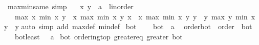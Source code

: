 \begin{isabellebody}
\endisatagproof
{\isafoldproof}%
%
\isadelimproof
\isanewline
%
\endisadelimproof
\isanewline
{}\isamarkupfalse%
\ max{\isacharunderscore}{\kern0pt}min{\isacharunderscore}{\kern0pt}same\ {\isacharbrackleft}{\kern0pt}simp{\isacharbrackright}{\kern0pt}{\isacharcolon}{\kern0pt}\isanewline
\ \ \ x\ y\ {\isacharcolon}{\kern0pt}{\isacharcolon}{\kern0pt}\ {\isachardoublequoteopen}{\isacharprime}{\kern0pt}a\ {\isacharcolon}{\kern0pt}{\isacharcolon}{\kern0pt}\ linorder{\isachardoublequoteclose}\isanewline
\ \ \ {\isachardoublequoteopen}max\ x\ {\isacharparenleft}{\kern0pt}min\ x\ y{\isacharparenright}{\kern0pt}\ {\isacharequal}{\kern0pt}\ x{\isachardoublequoteclose}\ {\isachardoublequoteopen}max\ {\isacharparenleft}{\kern0pt}min\ x\ y{\isacharparenright}{\kern0pt}\ x\ {\isacharequal}{\kern0pt}\ x{\isachardoublequoteclose}\ {\isachardoublequoteopen}max\ {\isacharparenleft}{\kern0pt}min\ x\ y{\isacharparenright}{\kern0pt}\ y\ {\isacharequal}{\kern0pt}\ y{\isachardoublequoteclose}\ {\isachardoublequoteopen}max\ y\ {\isacharparenleft}{\kern0pt}min\ x\ y{\isacharparenright}{\kern0pt}\ {\isacharequal}{\kern0pt}\ y{\isachardoublequoteclose}\isanewline
%
\isadelimproof
%
\endisadelimproof
%
\isatagproof
{}\isamarkupfalse%
{\isacharparenleft}{\kern0pt}auto\ simp\ add{\isacharcolon}{\kern0pt}\ max{\isacharunderscore}{\kern0pt}def\ min{\isacharunderscore}{\kern0pt}def{\isacharparenright}{\kern0pt}%
\endisatagproof
{\isafoldproof}%
%
\isadelimproof
%
\endisadelimproof
%
\isadelimdocument
%
\endisadelimdocument
%
\isatagdocument
%
\isamarkuptrue%
%
\endisatagdocument
{\isafolddocument}%
%
\isadelimdocument
%
\endisadelimdocument
{}\isamarkupfalse%
\ bot\ {\isacharequal}{\kern0pt}\isanewline
\ \ \ bot\ {\isacharcolon}{\kern0pt}{\isacharcolon}{\kern0pt}\ {\isacharprime}{\kern0pt}a\ {\isacharparenleft}{\kern0pt}{\isachardoublequoteopen}{\isasymbottom}{\isachardoublequoteclose}{\isacharparenright}{\kern0pt}\isanewline
\isanewline
{}\isamarkupfalse%
\ order{\isacharunderscore}{\kern0pt}bot\ {\isacharequal}{\kern0pt}\ order\ {\isacharplus}{\kern0pt}\ bot\ {\isacharplus}{\kern0pt}\isanewline
\ \ \ bot{\isacharunderscore}{\kern0pt}least{\isacharcolon}{\kern0pt}\ {\isachardoublequoteopen}{\isasymbottom}\ {\isasymle}\ a{\isachardoublequoteclose}\isanewline
{}\isanewline
\isanewline
{}\isamarkupfalse%
\ bot{\isacharcolon}{\kern0pt}\ ordering{\isacharunderscore}{\kern0pt}top\ greater{\isacharunderscore}{\kern0pt}eq\ greater\ bot\isanewline

\end{isabellebody}
